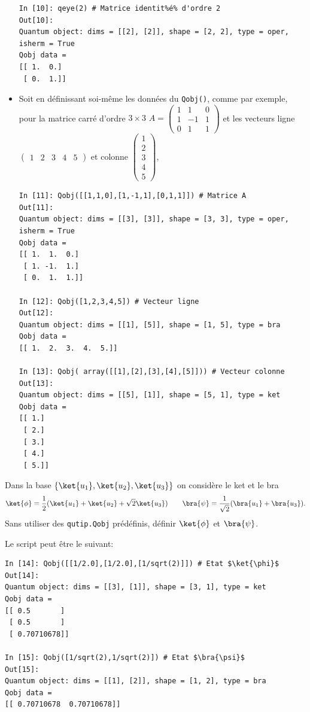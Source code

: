 \begin{itemize}
\begin{lstlisting}[commentstyle=\scriptsize]
In [10]: qeye(2) # Matrice identit%é% d'ordre 2
Out[10]: 
Quantum object: dims = [[2], [2]], shape = [2, 2], type = oper, isherm = True
Qobj data =
[[ 1.  0.]
 [ 0.  1.]]
\end{lstlisting}

\item Soit en définissant soi-même les données du \texttt{Qobj()}, comme par 
exemple, pour la matrice carré d'ordre $3\times3$ $A =\begin{pmatrix}
1&1&0\\1&-1&1\\0&1&1\end{pmatrix}$ et les vecteurs ligne 
$\begin{pmatrix}1&2&3&4&5\end{pmatrix}$ et colonne 
$\begin{pmatrix}1\\2\\3\\4\\5\end{pmatrix}$,
\begin{lstlisting}[commentstyle=\scriptsize]
In [11]: Qobj([[1,1,0],[1,-1,1],[0,1,1]]) # Matrice A
Out[11]: 
Quantum object: dims = [[3], [3]], shape = [3, 3], type = oper, isherm = True
Qobj data =
[[ 1.  1.  0.]
 [ 1. -1.  1.]
 [ 0.  1.  1.]]

In [12]: Qobj([1,2,3,4,5]) # Vecteur ligne
Out[12]: 
Quantum object: dims = [[1], [5]], shape = [1, 5], type = bra
Qobj data =
[[ 1.  2.  3.  4.  5.]]

In [13]: Qobj( array([[1],[2],[3],[4],[5]])) # Vecteur colonne
Out[13]: 
Quantum object: dims = [[5], [1]], shape = [5, 1], type = ket
Qobj data =
[[ 1.]
 [ 2.]
 [ 3.]
 [ 4.]
 [ 5.]]
\end{lstlisting}
\end{itemize}

\begin{exercise}
Dans la base $\{\ket{u_1},\ket{u_2},\ket{u_3}\}$ on considère le ket et le bra 
\begin{equation}
\ket{\phi}=\dfrac{1}{2}(\ket{u_1}+\ket{u_2}+\sqrt{2}\ket{u_3}) \qquad 
\bra{\psi}=\dfrac{1}{\sqrt{2}}(\bra{u_1}+\bra{u_3}).
\end{equation}
Sans utiliser des \texttt{qutip.Qobj} prédéfinis, définir $\ket{\phi}$ et 
$\bra{\psi}$.
\end{exercise}

\begin{solution}
Le script peut être le suivant:
\end{solution}
\begin{lstlisting}[commentstyle=\scriptsize]
In [14]: Qobj([[1/2.0],[1/2.0],[1/sqrt(2)]]) # Etat $\ket{\phi}$
Out[14]: 
Quantum object: dims = [[3], [1]], shape = [3, 1], type = ket
Qobj data =
[[ 0.5       ]
 [ 0.5       ]
 [ 0.70710678]]

In [15]: Qobj([1/sqrt(2),1/sqrt(2)]) # Etat $\bra{\psi}$
Out[15]: 
Quantum object: dims = [[1], [2]], shape = [1, 2], type = bra
Qobj data =
[[ 0.70710678  0.70710678]]
\end{lstlisting}

